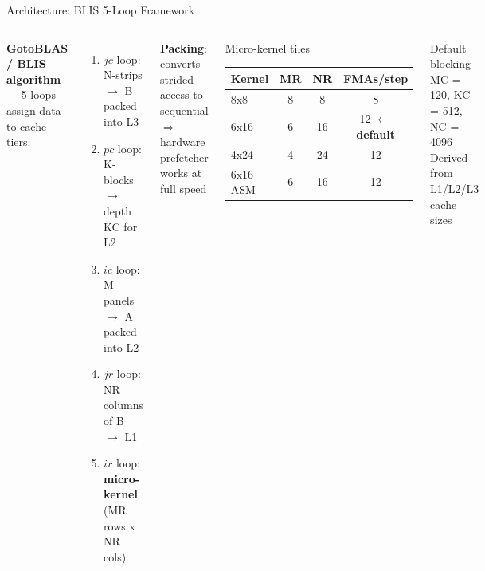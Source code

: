 \documentclass[aspectratio=169]{beamer}
\begin{document}
\begin{frame}{Architecture: BLIS 5-Loop Framework}
  \begin{columns}
    \textbf{GotoBLAS / BLIS algorithm} --- 5 loops assign data to cache tiers:
    \vspace{0.2cm}
    \begin{enumerate}
      \item[\textbf{L5}] $jc$ loop: N-strips $\to$ B packed into L3
      \item[\textbf{L4}] $pc$ loop: K-blocks $\to$ depth KC for L2
      \item[\textbf{L3}] $ic$ loop: M-panels $\to$ A packed into L2
      \item[\textbf{L2}] $jr$ loop: NR columns of B $\to$ L1
      \item[\textbf{L1}] $ir$ loop: \textbf{micro-kernel} (MR rows x NR cols)
    \end{enumerate}
    \vspace{0.2cm}
    \textbf{Packing}: converts strided access to sequential\\
    $\Rightarrow$ hardware prefetcher works at full speed

    \begin{block}{Micro-kernel tiles}
      \footnotesize
      \begin{tabular}{lccc}
        \toprule
        Kernel & MR & NR & FMAs/step \\
        \midrule
        8x8   & 8 & 8  & 8  \\
        6x16  & 6 & 16 & 12 \quad $\leftarrow$ \textbf{default} \\
        4x24  & 4 & 24 & 12 \\
        6x16 ASM & 6 & 16 & 12 \\
        \bottomrule
      \end{tabular}
    \end{block}
    \vspace{0.15cm}
    \begin{block}{Default blocking}
      \footnotesize
      MC = 120, KC = 512, NC = 4096\\
      Derived from L1/L2/L3 cache sizes
    \end{block}
  \end{columns}
\end{frame}
\end{document}
